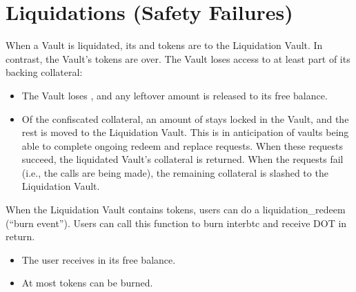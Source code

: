 \documentclass[a4paper,10pt,english]{sphinxmanual}
\begin{document}
\section{Liquidations (Safety Failures)}
\label{\detokenize{security_performance/liquidations:liquidations-safety-failures}}
When a Vault is liquidated, its  and  tokens are  to the Liquidation Vault.
In contrast, the Vault’s  tokens are  over.
The Vault loses access to at least part of its backing collateral:
\begin{itemize}
\item {} 
The Vault loses , and any leftover amount is released to its free balance.

\item {} 
Of the confiscated collateral, an amount of  stays locked in the Vault, and the rest is moved to the Liquidation Vault. This is in anticipation of vaults being able to complete ongoing redeem and replace requests. When these requests succeed, the liquidated Vault’s collateral is returned. When the requests fail (i.e., the  calls are being made), the remaining collateral is slashed to the Liquidation Vault.

\end{itemize}

When the Liquidation Vault contains tokens, users can do a liquidation\_redeem (“burn event”). Users can call this function to burn interbtc and receive DOT in return.
\begin{itemize}
\item {} 
The user receives  in its free balance.

\item {} 
At most  tokens can be burned.

\end{itemize}
\end{document}
